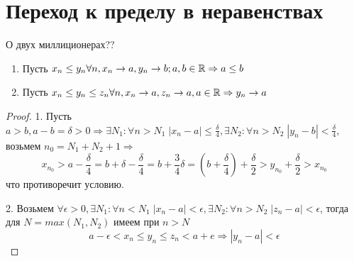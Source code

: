 \documentclass[main]{subfiles}
\begin{document}
\section{Переход к пределу в неравенствах}
\begin{theorem} О двух миллиционерах??
    \begin{enumerate}
        \item Пусть $x_n \leq y_n \forall n, x_n \to a, y_n \to b; a, b \in \mathbb{R}
    \Rightarrow a \leq b$
        \item Пусть $x_n \leq y_n \leq z_n \forall n, x_n \to a, z_n \to a,
    a \in \mathbb{R} \Rightarrow y_n \to a$
    \end{enumerate} 
\end{theorem}
\begin{proof}
    1. Пусть $a > b, a - b = \delta > 0 \Rightarrow \exists N_1 : \forall n > N_1
    \; |x_n - a| \leq \frac{\delta}{4}, \exists N_2 : \forall n > N_2 \; 
    |y_n - b| < \frac{\delta}{4}$, возьмем $n_0 = N_1 + N_2 + 1 \Rightarrow$
    \begin{equation*}
        x_{n_0} > a - \frac{\delta}{4} = b + \delta - \frac{\delta}{4} = 
        b + \frac{3}{4}\delta = (b + \frac{\delta}{4}) + \frac{\delta}{2} >
        y_{n_0} + \frac{\delta}{2} > x_{n_0}
    \end{equation*}
    что противоречит условию.

    2. Возьмем $\forall \epsilon > 0, \exists N_1 : \forall n < N_1 \; 
    |x_n - a| < \epsilon, \exists N_2 : \forall n > N_2 \; |z_n - a| < \epsilon$,
    тогда для $N = max(N_1, N_2)$ имеем при $n > N$
    \begin{equation*}
        a - \epsilon < x_n \leq y_n \leq z_n < a + e \Rightarrow 
        |y_n - a| < \epsilon 
    \end{equation*}
\end{proof}
\end{document}
